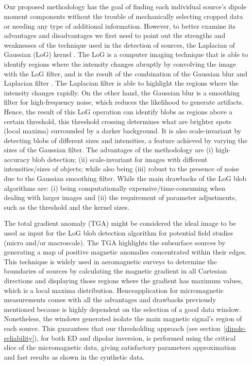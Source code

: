 \DIFaddbegin \subsection{} %

\DIFaddend Our proposed methodology has the goal of finding each individual source’s dipole moment components without the trouble of mechanically selecting cropped data or needing any type of additional information.
However, to better examine its advantages and disadvantages we first need to point out the strengths and weaknesses of the technique used in the detection of sources, the Laplacian of Gaussian (LoG) kernel \citep{Marr1980}.
The LoG is a computer imaging technique that is able to identify regions where the intensity changes abruptly by convolving the image with the LoG filter, and is the result of the combination of the Gaussian blur and Laplacian filter \citep{gonzalez2018}.
The Laplacian filter is able to highlight the regions where the intensity changes rapidly.
On the other hand, the Gaussian blur is a smoothing filter for high-frequency noise, which reduces the likelihood to generate artifacts.
Hence, the result of this LoG operation can identify blobs as regions above a certain threshold, this threshold crossing determines what are brighter spots (local maxima) surrounded by a darker background.
It is also scale-invariant by detecting blobs of different sizes and intensities, a feature achieved by varying the sizes of the Gaussian filter.
The advantages of the methodology are (i) high-accuracy blob detection; (ii) scale-invariant for images with different intensities/sizes of objects; while also being (iii) robust to the presence of noise due to the Gaussian smoothing filter.
While the main drawbacks of the LoG blob algorithms are: (i) being computationally expensive/time-consuming when dealing with larger images and (ii) the requirement of parameter adjustments, such as the threshold and the kernel sizes.

The total gradient anomaly (TGA) might be considered the ideal image to be used as input for the LoG blob detection algorithm for potential field studies (micro and/or macroscale).
The TGA highlights the subsurface sources by generating a map of positive magnetic anomalies concentrated within their edges.
This technique is widely used in aeromagnetic surveys to determine the boundaries of sources by calculating the magnetic gradient in all Cartesian directions and displaying those regions where the gradient has maximum values, which is a local maxima distribution.
Hence\DIFdelbegin {}\DIFdelend \DIFaddbegin {}\DIFaddend application for micromagnetic measurements comes with all the advantages and drawbacks previously mentioned because is highly dependent on the selection of a good data window.
Nonetheless, the windows generated isolate the main magnetic signal’s region of each source.
This guarantees that our thresholding approach (see section~\ref{dipole-reliability}), for both ED and dipolar inversion, is performed using the critical slice of the micromagnetic data, giving satisfactory parameters approximation and fast results as shown in the synthetic data.

